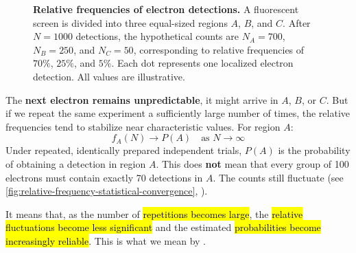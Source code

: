 \begin{figure}[!htbp]

    \caption{
        \textbf{Relative frequencies of electron detections.}
        A fluorescent screen is divided into three
        equal-sized regions $A$, $B$, and $C$.
        After $N=1000$ detections, the hypothetical
        counts are $N_A=700$, $N_B=250$, and
        $N_C=50$, corresponding to relative
        frequencies of $70\%$, $25\%$, and $5\%$.
        Each dot represents one localized electron
        detection. All values are illustrative.
    }

    \label{fig:relative-frequency-screen-regions}

\end{figure}

\noindent
The \textbf{next electron remains unpredictable}, it might arrive in $A$, $B$, or $C$. But if we repeat the same experiment a sufficiently large number of times, the relative frequencies tend to stabilize near characteristic values. For region $A$:
\begin{equation*}
    f_A(N)\longrightarrow P(A)\quad\text{as }N\rightarrow\infty
\end{equation*}
Under repeated, identically prepared independent trials, $P(A)$ is the probability of obtaining a detection in region $A$. This does \textbf{not} mean that every group of 100 electrons must contain exactly 70 detections in $A$. The counts still fluctuate (see \autoref{fig:relative-frequency-statistical-convergence}, ).

\highspace
It means that, as the number of \hl{repetitions becomes large}, the \hl{relative fluctuations become less significant} and the estimated \hl{probabilities become increasingly reliable}. This is what we mean by .

\newpage

